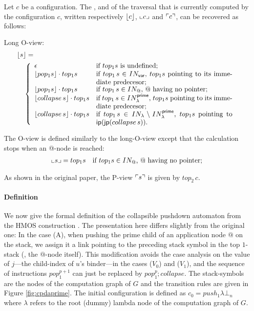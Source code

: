 \documentclass[a4paper]{article}[12pt]
\theoremstyle{remark}
\theoremstyle{definition}
\newcommand\INodes{IN}%
\begin{document}
Let $c$ be a configuration. The ,
 and  of the traversal that is currently computed by the configuration $c$, written respectively $\lfloor c \rfloor$, $\llcorner c \lrcorner$ and $\ulcorner c \urcorner$, can be recovered as follows:
\begin{compactitem}
\item Long O-view:
\begin{align*}
&  \longoview{s} = \\
 & \quad \left\{
  \begin{array}{ll}
      \epsilon & \mbox{if $top_1 s$ is undefined;} \\
      \longoview{pop_1 s} \cdot top_1 s & \parbox[t]{7cm}{if $top_1\,s \in \INodes_{\sf var}$, $top_1 s$ pointing to its immediate predecesor;} \\
      \longoview{pop_1 s} \cdot top_1 s & \mbox{if $top_1\,s \in \INodes_@$, $@$ having no pointer;} \\
      \longoview{collapse\,s} \cdot top_1 s & \parbox[t]{7cm}{if $top_1\,s \in \INodes_\lambda^{\sf prime}$, $top_1 s$ pointing to its immediate predecesor;} \\
      \longoview{collapse\,s} \cdot top_1 s & \parbox[t]{7cm}{if $top_1\,s \in \INodes_\lambda\setminus \INodes_\lambda^{\sf prime}$, $top_1 s$ pointing to $\ip(\jp(collapse\,s))$.}
    \end{array}
      \right.
\end{align*}
\item The O-view is defined similarly to the long-O-view except that the calculation stops when an @-node is reached:
\begin{align*}
  \oview{s}  &=   top_1 s & \mbox{if $top_1 s \in \INodes_@$, $@$ having no pointer;}
\end{align*}
\item As shown in the original paper, the P-view $\ulcorner s \urcorner$ is given by $top_2\,c$.
\end{compactitem}
\bigskip



\paragraph{Definition}
We now give the formal definition of the collapsible pushdown automaton from the HMOS construction
\cite{hmos-lics08}. The presentation here differs slightly from the original one: In the case (A), when pushing the prime child of an application node $@$ on the stack, we assign it a link pointing to the preceding stack symbol in the top $1$-stack (\ie, the $@$-node itself).
 This modification avoids the case analysis on the value of $j$---the child-index of $u$'s binder---in the
 cases ($V_0$) and ($V_1$), and the sequence of instructions $pop_1^{p+1}$ can just be replaced by
 $pop_1^p ; collapse$. The stack-symbols are the nodes of the computation graph of $G$ and the transition rules are given in
Figure \ref{fig:cpdaprime}. The initial configuration is defined as $c_0 = push_1 \lambda \bot_n$
where $\lambda$ refers to the root (dummy) lambda node of the computation graph of $G$.
\end{document}
